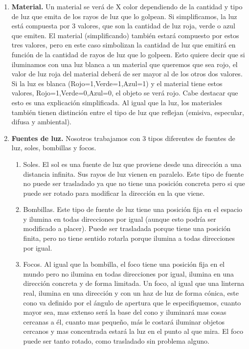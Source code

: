 \documentclass[12pt,a4paper]{article}
\begin{document}
\begin{enumerate}
\begin{enumerate}
\begin{enumerate}
\begin{enumerate}
\item \textbf{Material.}
Un material se verá de X color dependiendo de la cantidad y tipo de luz que emita de los rayos de luz que lo golpean. Si simplificamos, la luz está compuesta por 3 valores, que son la cantidad de luz roja, verde o azul que emiten. El material (simplificando) también estará compuesto por estos tres valores, pero en este caso simbolizan la cantidad de luz que emitirá en función de la cantidad de rayos de luz que lo golpeen. Esto quiere decir que si iluminamos con una luz blanca a un material que queremos que sea rojo, el valor de luz roja del material deberá de ser mayor al de los otros dos valores. Si la luz es blanca (Rojo=1,Verde=1,Azul=1) y el material tiene estos valores, {Rojo=1,Verde=0,Azul=0}, el objeto se verá rojo.\newline
Cabe destacar que esto es una explicación simplificada. Al igual que la luz, los materiales también tienen distinción entre el tipo de luz que reflejan (emisiva, especular, difusa y ambiental).

\item \textbf{Fuentes de luz.}
Nosotros trabajamos con 3 tipos diferentes de fuentes de luz, soles, bombillas y focos. 
\begin{enumerate}
\item {Soles.}
El sol es una fuente de luz que proviene desde una dirección a una distancia infinita. Sus rayos de luz vienen en paralelo.\newline
Este tipo de fuente no puede ser trasladado ya que no tiene una posición concreta pero si que puede ser rotado para modificar la dirección en la que viene.
\item {Bombillas.}
Este tipo de fuente de luz tiene una posición fija en el espacio y ilumina en todas direcciones por igual (aunque esto podría ser modificado a placer).\newline
Puede ser trasladada porque tiene una posición finita, pero no tiene sentido rotarla porque ilumina a todas direcciones por igual.
\item {Focos.}
Al igual que la bombilla, el foco tiene una posición fija en el mundo pero no ilumina en todas direcciones por igual, ilumina en una dirección concreta y de forma limitada. Un foco, al igual que una linterna real, ilumina en una dirección y con un haz de luz de forma cónica, este cono va definido por el ángulo de apertura que le especifiquemos, cuanto mayor sea, mas extenso será la base del cono y iluminará mas cosas cercanas a él, cuanto mas pequeño, más le costará iluminar objetos cercanos y mas concentrada estará la luz en el punto al que mira.\newline 
El foco puede ser tanto rotado, como trasladado sin problema alguno.
\end{enumerate}
\end{enumerate}


\end{enumerate}
\end{enumerate}
\end{enumerate}
\end{document}
